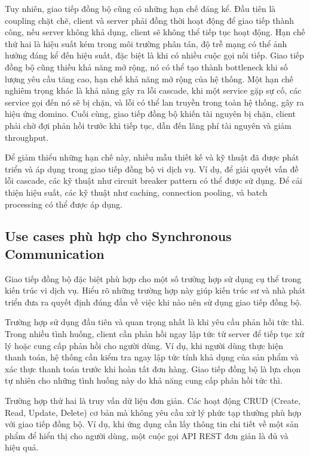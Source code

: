 Tuy nhiên, giao tiếp đồng bộ cũng có những hạn chế đáng kể. Đầu tiên là coupling chặt chẽ, client và server phải đồng thời hoạt động để giao tiếp thành công, nếu server không khả dụng, client sẽ không thể tiếp tục hoạt động. Hạn chế thứ hai là hiệu suất kém trong môi trường phân tán, độ trễ mạng có thể ảnh hưởng đáng kể đến hiệu suất, đặc biệt là khi có nhiều cuộc gọi nối tiếp. Giao tiếp đồng bộ cũng thiếu khả năng mở rộng, nó có thể tạo thành bottleneck khi số lượng yêu cầu tăng cao, hạn chế khả năng mở rộng của hệ thống. Một hạn chế nghiêm trọng khác là khả năng gây ra lỗi cascade, khi một service gặp sự cố, các service gọi đến nó sẽ bị chặn, và lỗi có thể lan truyền trong toàn hệ thống, gây ra hiệu ứng domino. Cuối cùng, giao tiếp đồng bộ khiến tài nguyên bị chặn, client phải chờ đợi phản hồi trước khi tiếp tục, dẫn đến lãng phí tài nguyên và giảm throughput.

Để giảm thiểu những hạn chế này, nhiều mẫu thiết kế và kỹ thuật đã được phát triển và áp dụng trong giao tiếp đồng bộ vi dịch vụ. Ví dụ, để giải quyết vấn đề lỗi cascade, các kỹ thuật như circuit breaker pattern có thể được sử dụng. Để cải thiện hiệu suất, các kỹ thuật như caching, connection pooling, và batch processing có thể được áp dụng.

\subsection{Use cases phù hợp cho Synchronous Communication}
Giao tiếp đồng bộ đặc biệt phù hợp cho một số trường hợp sử dụng cụ thể trong kiến trúc vi dịch vụ. Hiểu rõ những trường hợp này giúp kiến trúc sư và nhà phát triển đưa ra quyết định đúng đắn về việc khi nào nên sử dụng giao tiếp đồng bộ.

Trường hợp sử dụng đầu tiên và quan trọng nhất là khi yêu cầu phản hồi tức thì. Trong nhiều tình huống, client cần phản hồi ngay lập tức từ server để tiếp tục xử lý hoặc cung cấp phản hồi cho người dùng. Ví dụ, khi người dùng thực hiện thanh toán, hệ thống cần kiểm tra ngay lập tức tính khả dụng của sản phẩm và xác thực thanh toán trước khi hoàn tất đơn hàng. Giao tiếp đồng bộ là lựa chọn tự nhiên cho những tình huống này do khả năng cung cấp phản hồi tức thì.

Trường hợp thứ hai là truy vấn dữ liệu đơn giản. Các hoạt động CRUD (Create, Read, Update, Delete) cơ bản mà không yêu cầu xử lý phức tạp thường phù hợp với giao tiếp đồng bộ. Ví dụ, khi ứng dụng cần lấy thông tin chi tiết về một sản phẩm để hiển thị cho người dùng, một cuộc gọi API REST đơn giản là đủ và hiệu quả.

